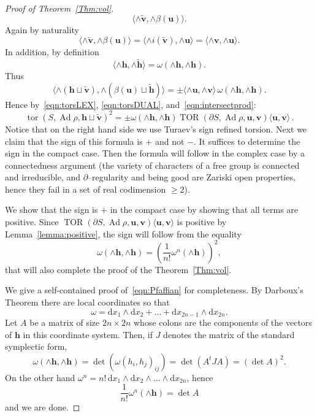 \documentclass[11pt]{article}
\theoremstyle{definition}
\numberwithin{equation}{section}
\numberwithin{figure}{section}
\numberwithin{table}{section}
\DeclareMathOperator{\tor}{tor}
\DeclareMathOperator{\TOR}{TOR}
\DeclareMathOperator{\Ad}{Ad}
\newcommand{\ubf}{\mathbf{u}}
\newcommand{\vbf}{\mathbf{v}}
\newcommand{\hbf}{\mathbf{h}}
\newcommand*{\dd}{\mathrm{d}}
\begin{document}
\begin{proof}[Proof of Theorem~\ref{Thm:vol}]
\[\langle \wedge \widetilde{\vbf}, \wedge \beta(\ubf) \rangle.
\]
Again by naturality
\[
\langle \wedge \widetilde{\vbf}, \wedge \beta(\ubf) \rangle =
\langle \wedge i(\widetilde{\vbf}), \wedge \ubf \rangle =
\langle \wedge {\vbf},\wedge \ubf \rangle.
\]
In addition, by definition
\[
\langle \wedge{\hbf}, \wedge\widetilde{{\hbf}} \rangle = \omega(\wedge {\hbf}, \wedge{\hbf}).
\]
Thus
\begin{equation}\label{eqn:intersectprod}
\langle \wedge(\hbf\sqcup \widetilde{\vbf}), \wedge (\beta (\ubf) \sqcup \widetilde{\hbf}) \rangle=
\pm \langle\wedge \ubf,\wedge \vbf\rangle \, \omega(\wedge {\hbf}, \wedge{\hbf}).
\end{equation}
Hence by~\eqref{eqn:torsLEX}, \eqref{eqn:torsDUAL}, and~\eqref{eqn:intersectprod}:
\begin{equation*}
\tor(S,\Ad\rho, \hbf\sqcup \widetilde{\vbf})^2=
\pm
\omega(\wedge {\hbf}, \wedge {\hbf}) \TOR(\partial S,\Ad\rho, \ubf, \vbf) \langle \ubf, \vbf \rangle \,.
\end{equation*}
Notice that on the right hand side we use Turaev's sign refined torsion. Next we claim that the sign of this formula is $+$ and not $-$. It suffices to determine the sign in the compact case. Then the formula will follow in the complex case by a connectedness argument (the variety of characters of a free group is connected and irreducible, and $\partial$--regularity and being good are Zariski open properties, hence they fail in a set of real codimension $\geq 2$).

We show that the sign is $+$ in the compact case by showing that all terms are positive. Since $\TOR(\partial S,\Ad\rho, \ubf, \vbf) \langle \ubf, \vbf \rangle$ is positive by Lemma~\ref{lemma:positive}, the sign will follow from the equality
\begin{equation}\label{eqn:Pfaffian}
\omega(\wedge {\hbf}, \wedge {\hbf}) = \left(
\frac{1}{n!}\omega^n(\wedge \hbf)
\right)^2,
\end{equation}
that will also complete the proof of the Theorem~\ref{Thm:vol}.

We give a self-contained proof of~\eqref{eqn:Pfaffian} for completeness. By Darboux's Theorem there are local coordinates so that
\[
\omega=\dd x_1\wedge \dd x_2+\dots+ \dd x_{2 n-1}\wedge \dd x_{2n}.
\]
Let $A$ be a matrix of size $2n\times 2n$ whose colons are the components of the vectors of $\hbf$ in this coordinate system. Then, if $J$ denotes the matrix of the standard symplectic form,
\[
\omega(\wedge {\hbf}, \wedge {\hbf})=\det\left(\omega(h_i,h_j)_{ij} \right)=\det (A^t J A)= (\det A)^2.
\]
On the other hand $
\omega^n= n! \, \dd x_1\wedge \dd x_2\wedge\dots \wedge \dd x_{2n}$, hence
\[
\frac{1}{n!}\omega^n(\wedge \hbf)=\det A
\]
and we are done.
\end{proof}
\end{document}
